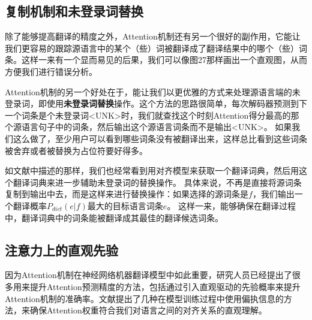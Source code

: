 \documentclass[10pt,a4paper]{ctexart}
\begin{document}
\subsection{复制机制和未登录词替换}
除了能够提高翻译的精度之外，Attention机制还有另一个很好的副作用，它能让我们更容易的跟踪源语言中的某个（些）词被翻译成了翻译结果中的哪个（些）词条。这样一来有一个显而易见的后果，我们可以像图27那样画出一个直观图，从而方便我们进行错误分析。

Attention机制的另一个好处在于，能让我们以更优雅的方式来处理源语言端的未登录词，即使用\textbf{未登录词替换}操作\cite{luong2014addressing}。这个方法的思路很简单，每次解码器预测到下一个词条是个未登录词<UNK>时，我们就查找这个时刻Attention得分最高的那个源语言句子中的词条，然后输出这个源语言词条而不是输出<UNK>。
如果我们这么做了，至少用户可以看到哪些词条没有被翻译出来，这样总比看到这些词条被舍弃或者被替换为占位符要好得多。

如文献\cite{brown1993mathematics}中描述的那样，我们也经常看到用对齐模型来获取一个翻译词典，然后用这个翻译词典来进一步辅助未登录词的替换操作。
具体来说，不再是直接将源词条复制到输出中去，而是这样来进行替换操作：如果选择的源词条是$f$，我们输出一个翻译概率$P_{dict}(e|f)$最大的目标语言词条$e$。
这样一来，能够确保在翻译过程中，翻译词典中的词条能被翻译成其最佳的翻译候选词条。

\subsection{注意力上的直观先验}
因为Attention机制在神经网络机器翻译模型中如此重要，研究人员已经提出了很多用来提升Attention预测精度的方法，包括通过引入直观驱动的先验概率来提升Attention机制的准确率。文献\cite{cohn2016incorporating}提出了几种在模型训练过程中使用偏执信息的方法，来确保Attention权重符合我们对语言之间的对齐关系的直观理解。
\end{document}
